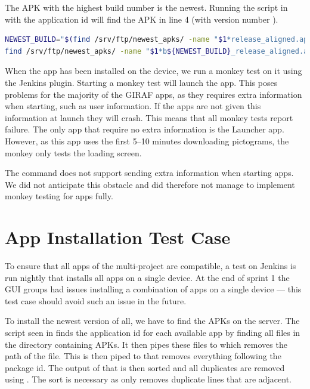 The APK with the highest build number is the newest. Running the script in  with the application id  will find the APK in line 4 (with version number ).

\begin{lstlisting}[language=bash,showstringspaces=false,caption=Bash script that finds the newest APK for a particular application id,label=lst:find_newest_apk]
NEWEST_BUILD="$(find /srv/ftp/newest_apks/ -name "$1*release_aligned.apk" | sed 's/.*b//' | sed 's/_release_aligned.apk//' | awk '$0>x{x=$0};END{print x}')"
find /srv/ftp/newest_apks/ -name "$1*b${NEWEST_BUILD}_release_aligned.apk"
\end{lstlisting}

When the app has been installed on the device, we run a monkey test on it using the Jenkins plugin. Starting a monkey test will launch the app. This poses problems for the majority of the GIRAF apps, as they requires extra information when starting, such as user information. If the apps are not given this information at launch they will crash. This means that all monkey tests report failure. The only app that require no extra information is the Launcher app. However, as this app uses the first 5--10 minutes downloading pictograms, the monkey only tests the loading screen.

The  command does not support sending extra information when starting apps. We did not anticipate this obstacle and did therefore not manage to implement monkey testing for apps fully.


\section{App Installation Test Case}\label{sec:s3_appinstallationtest}
To ensure that all apps of the multi-project are compatible, a test on Jenkins is run nightly that installs all apps on a single device. At the end of sprint 1 the GUI groups had issues installing a combination of apps on a single device --- this test case should avoid such an issue in the future.

To install the newest version of all, we have to find the APKs on the server. The script seen in  finds the application id for each available app by finding all files in the directory containing APKs. It then pipes these files to  which removes the path of the file. This is then piped to  that removes everything following the package id. The output of that is then sorted and all duplicates are removed using . The sort is necessary as  only removes duplicate lines that are adjacent.

